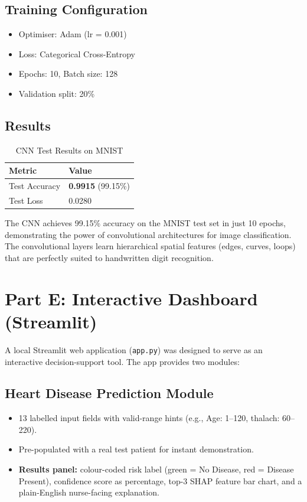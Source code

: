 \documentclass[12pt,a4paper]{article}
\begin{document}
\subsection{Training Configuration}

\begin{itemize}
    \item Optimiser: Adam (lr = 0.001)
    \item Loss: Categorical Cross-Entropy
    \item Epochs: 10, Batch size: 128
    \item Validation split: 20\%
\end{itemize}

\subsection{Results}

\begin{table}[H]
\centering
\caption{CNN Test Results on MNIST}
\begin{tabular}{ll}
\toprule
\textbf{Metric} & \textbf{Value} \\
\midrule
Test Accuracy & \textbf{0.9915} (99.15\%) \\
Test Loss     & 0.0280 \\
\bottomrule
\end{tabular}
\end{table}

The CNN achieves 99.15\% accuracy on the MNIST test set in just 10 epochs, demonstrating the power of convolutional architectures for image classification. The convolutional layers learn hierarchical spatial features (edges, curves, loops) that are perfectly suited to handwritten digit recognition.

\section{Part E: Interactive Dashboard (Streamlit)}

A local Streamlit web application (\texttt{app.py}) was designed to serve as an interactive decision-support tool. The app provides two modules:

\subsection{Heart Disease Prediction Module}
\begin{itemize}
    \item 13 labelled input fields with valid-range hints (e.g., Age: 1--120, thalach: 60--220).
    \item Pre-populated with a real test patient for instant demonstration.
    \item \textbf{Results panel:} colour-coded risk label (green = No Disease, red = Disease Present), confidence score as percentage, top-3 SHAP feature bar chart, and a plain-English nurse-facing explanation.
\end{itemize}
\end{document}
